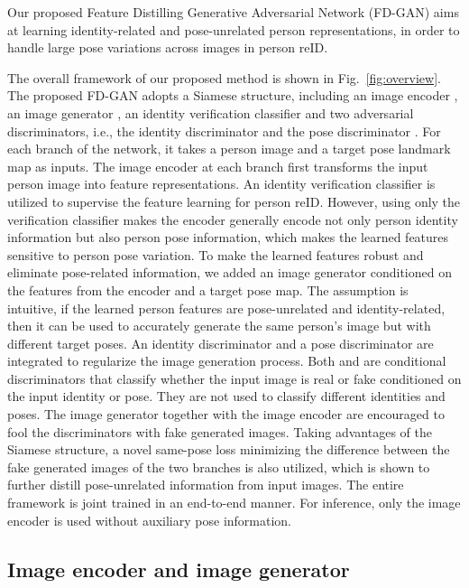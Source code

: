 \documentclass{article}
\begin{document}
Our proposed Feature Distilling Generative Adversarial Network (FD-GAN) aims at learning identity-related and pose-unrelated person representations, in order to handle large pose variations across images in person reID.

The overall framework of our proposed method is shown in Fig.~\ref{fig:overview}. The proposed FD-GAN adopts a Siamese structure, including an image encoder , an image generator , an identity verification classifier  and two adversarial discriminators, i.e., the identity discriminator  and the pose discriminator .
For each branch of the network, it takes a person image and a target pose landmark map as inputs. The image encoder  at each branch first transforms the input person image into feature representations. An identity verification classifier is utilized to supervise the feature learning for person reID.
However, using only the verification classifier makes the encoder generally encode not only person identity information but also person pose information, which makes the learned features sensitive to person pose variation. To make the learned features robust and eliminate pose-related information, we added an image generator  conditioned on the features from the encoder and a target pose map. The assumption is intuitive, if the learned person features are pose-unrelated and identity-related, then it can be used to accurately generate the same person's image but with different target poses. An identity discriminator  and a pose discriminator  are integrated to regularize the image generation process. Both  and  are conditional discriminators that classify whether the input image is real or fake conditioned on the input identity or pose. They are not used to classify different identities and poses. The image generator together with the image encoder are encouraged to fool the discriminators with fake generated images. Taking advantages of the Siamese structure, a novel same-pose loss minimizing the difference between the fake generated images of the two branches is also utilized, which is shown to further distill pose-unrelated information from input images.
The entire framework is joint trained in an end-to-end manner. For inference, only the image encoder  is used without auxiliary pose information.

\subsection{Image encoder and image generator}
\label{sec:g}
\end{document}
